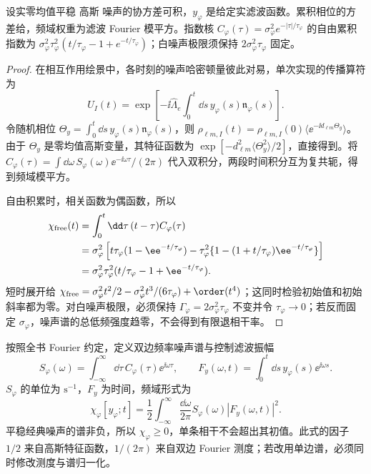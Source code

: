 \begin{proposition}[高斯 滤波相位与指数相关闭式]
设实零均值平稳 高斯 噪声的协方差可积，$y_\varphi$ 是给定实滤波函数。累积相位的方差给，频域权重为滤波 Fourier 模平方。指数核 $C_\varphi(\tau)=\sigma_\varphi^2e^{-|\tau|/\tau_\varphi}$ 的自由累积指数为 $\sigma_\varphi^2\tau_\varphi^2(t/\tau_\varphi-1+e^{-t/\tau_\varphi})$；白噪声极限须保持 $2\sigma_\varphi^2\tau_\varphi$ 固定。
\end{proposition}
\begin{proof}
在相互作用绘景中，各时刻的噪声哈密顿量彼此对易，单次实现的传播算符为
\begin{equation*}
 U_I(t)=\exp\!\left[-\ii\hat\Lambda_e\int_0^t\dd s\,
 y_\varphi(s)\mathfrak n_\varphi(s)\right].
\end{equation*}
令随机相位 $\Theta_y=\int_0^t\dd s\,y_\varphi(s)\mathfrak n_\varphi(s)$，则
$\rho_{\ell m,I}(t)=\rho_{\ell m,I}(0)\langle\ee^{-\ii d_{\ell m}\Theta_y}\rangle$。
由于 $\Theta_y$ 是零均值高斯变量，其特征函数为 $\exp[-d_{\ell m}^2\langle\Theta_y^2\rangle/2]$，直接得到。将 $C_\varphi(\tau)=\int\dd\omega\,S_\varphi(\omega)\ee^{-\ii\omega\tau}/(2\pi)$ 代入双积分，两段时间积分互为复共轭，得到频域模平方。

自由积累时，相关函数为偶函数，所以
\begin{align*}
 \chi_{\rm free}(t)
 &=\int_0^t\dd\tau\,(t-\tau)C_\varphi(\tau)\\
 &=\sigma_\varphi^2\left[t\tau_\varphi(1-\ee^{-t/\tau_\varphi})
 -\tau_\varphi^2\{1-(1+t/\tau_\varphi)\ee^{-t/\tau_\varphi}\}\right]\\
 &=\sigma_\varphi^2\tau_\varphi^2(t/\tau_\varphi-1+\ee^{-t/\tau_\varphi}).
\end{align*}
短时展开给 $\chi_{\rm free}=\sigma_\varphi^2t^2/2-\sigma_\varphi^2t^3/(6\tau_\varphi)+\order(t^4)$；这同时检验初始值和初始斜率都为零。对白噪声极限，必须保持 $\Gamma_\varphi=2\sigma_\varphi^2\tau_\varphi$ 不变并令 $\tau_\varphi\to0$；若反而固定 $\sigma_\varphi$，噪声谱的总低频强度趋零，不会得到有限退相干率。
\end{proof}


按照全书 Fourier 约定，定义双边频率噪声谱与控制滤波振幅
\begin{equation*}
 S_\varphi(\omega)=\int_{-\infty}^{\infty}\dd\tau\,
 C_\varphi(\tau)\ee^{\ii\omega\tau},\qquad
 F_{y}(\omega,t)=\int_0^t\dd s\,y_\varphi(s)\ee^{\ii\omega s}.
\end{equation*}
$S_\varphi$ 的单位为 $\mathrm{s^{-1}}$，$F_y$ 为时间，频域形式为
\begin{equation}
 \chi_\varphi[y_\varphi;t]
 =\frac12\int_{-\infty}^{\infty}\frac{\dd\omega}{2\pi}
 S_\varphi(\omega)|F_y(\omega,t)|^2.
 \label{eq:electron-noise-filter-frequency}
\end{equation}
平稳经典噪声的谱非负，所以 $\chi_\varphi\geq0$，单条相干不会超出其初值。此式的因子 $1/2$ 来自高斯特征函数，$1/(2\pi)$ 来自双边 Fourier 测度；若改用单边谱，必须同时修改测度与谱归一化。

